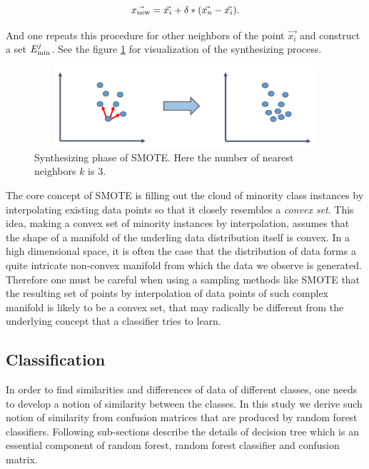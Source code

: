 \documentclass{article}
\begin{document}
		\begin{equation}
		\vec{x_{\rm{new}}} = \vec{x_{i}} + \delta*(\vec{x_{n}} - \vec{x_{i}}).
		\end{equation}

And one repeats this procedure for other neighbors of the point $\vec{x_i}$ and construct a set $E_{\rm{min}}^j$. See the figure \ref{smote} for visualization of the synthesizing process.	
		
		\begin{figure}[ht]
		\begin{center}
		\vspace{0.5cm}
		\includegraphics[clip,width=12cm,height = 3cm]{figs/SMOTE.png}
		\vspace{0.5cm}
		\caption{Synthesizing phase of SMOTE. Here the number of nearest neighbors $k$ is 3.}
		\label{smote}
		\end{center}
		\end{figure}
		

The core concept of SMOTE is filling out the cloud of minority class instances by interpolating existing data points so that it closely resembles a \textit{convex set}. This idea, making a convex set of minority instances by interpolation, assumes that the shape of a manifold of the underling data distribution itself is convex. In a high dimensional space, it is often the case that the distribution of data forms a quite intricate non-convex manifold from which the data we observe is generated. Therefore one must be careful when using a sampling methods like SMOTE that the resulting set of points by interpolation of data points of such complex manifold is likely to be a convex set, that may radically be different from the underlying concept that a classifier tries to learn.

	\subsection{Classification}
	In order to find similarities and differences of data of different classes, one needs to develop a notion of similarity between the classes. In this study we derive such notion of similarity from confusion matrices that are produced by random forest classifiers. Following sub-sections describe the details of decision tree which is an essential component of random forest, random forest classifier and confusion matrix.
	
\end{document}

